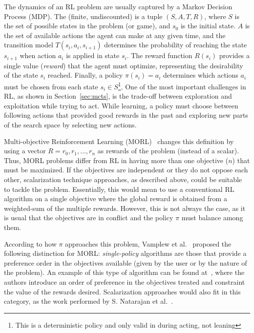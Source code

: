 \documentclass[journal]{IEEEtran}
\begin{document}
The dynamics of an RL problem are usually captured by a Markov Decision Process (MDP). The (finite, undiscounted) is a tuple $(S, A, T, R)$, where $S$ is the set of possible states in the problem (or game), and $s_0$ is the initial state. $A$ is the set of available actions the agent can make at any given time, and the transition model $T(s_i, a_i, s_{i+1})$ determines the probability of reaching the state $s_{i+1}$ when action $a_i$ is applied in state $s_i$. The reward function $R(s_i)$ provides a single value (\textit{reward}) that the agent must optimize, representing the desirability of the state $s_i$ reached. Finally, a policy $\pi(s_i) = a_i$ determines which actions $a_i$ must be chosen from each state $s_i \in S$\footnote{This is a deterministic policy and only valid in during acting, not leaning}. One of the most important challenges in RL, as shown in Section~\ref{sec:mcts}, is the trade-off between exploration and exploitation while trying to act. While learning, a  policy must choose between following actions that provided good rewards in the past and exploring new parts of the search space by selecting new actions. 

Multi-objective Reinforcement Learning (MORL)~\cite{Vamplew2010} changes this definition by using a vector $R = {r_0, r_1, \dots, r_n}$ as rewards of the problem (instead of a scalar). Thus, MORL problems differ from RL in having more than one objective ($n$) that must be maximized. If the objectives are independent or they do not oppose each other, scalarization technique approaches, as described above, could be suitable to tackle the problem. Essentially, this would mean to use a conventional RL algorithm on a single objective where the global reward is obtained from a weighted-sum of the multiple rewards. However, this is not always the case, as it is usual that the objectives are in conflict and the policy $\pi$ must balance among them.

According to how $\pi$ approaches this problem, Vamplew et al.~\cite{Vamplew2010} proposed the following distinction for MORL: \textit{single-policy} algorithms are those that provide a preference order in the objectives available (given by the user or by the nature of the problem). An example of this type of algorithm can be found at~\cite{Gabor1998}, where the authors introduce an order of preference in the objectives treated and constraint the value of the rewards desired. Scalarization approaches would also fit in this category, as the work performed by S. Natarajan et al.~\cite{Natarajan2005}.
\end{document}
